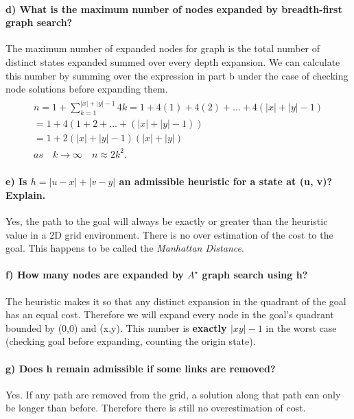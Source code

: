 \documentclass[12pt]{article}
\begin{document}
\paragraph{d) What is the maximum number of nodes expanded by breadth-first graph search?}
The maximum number of expanded nodes for graph is the total number of distinct states expanded summed over every depth expansion. We can calculate this number by summing over the expression in part b under the case of checking node solutions before expanding them.
\begin{align}
\begin{split}
n = 1 + \sum_{k=1}^{|x|+|y|-1} 4k =1 + 4(1) + 4(2) + ...+4(|x|+|y|-1) \\
= 1 + 4(1 + 2 + ... + (|x|+|y| -1))\\
= 1 + 2(|x|+|y|-1)(|x|+|y|)\\
as \quad k \rightarrow \infty \quad n \approx 2k^2.
\end{split}
\end{align}
\paragraph{e) Is $h = |u - x| + |v - y|$ an admissible heuristic for a state at (u, v)? Explain.}
Yes, the path to the goal will always be exactly or greater than the heuristic value in a 2D grid environment. There is no over estimation of the cost to the goal. This happens to be called the \textit{Manhattan Distance}.
\paragraph{f) How many nodes are expanded by $A^{\star}$ graph search using h?}
The heuristic makes it so that any distinct expansion in the quadrant of the goal has an equal cost. Therefore we will expand every node in the goal's quadrant bounded by (0,0) and (x,y). This number is \textbf{exactly $|xy|-1$} in the worst case (checking goal before expanding, counting the origin state).
\paragraph{g) Does h remain admissible if some links are removed?}
Yes. If any path are removed from the grid, a solution along that path can only be longer than before. Therefore there is still no overestimation of cost.
\end{document}
